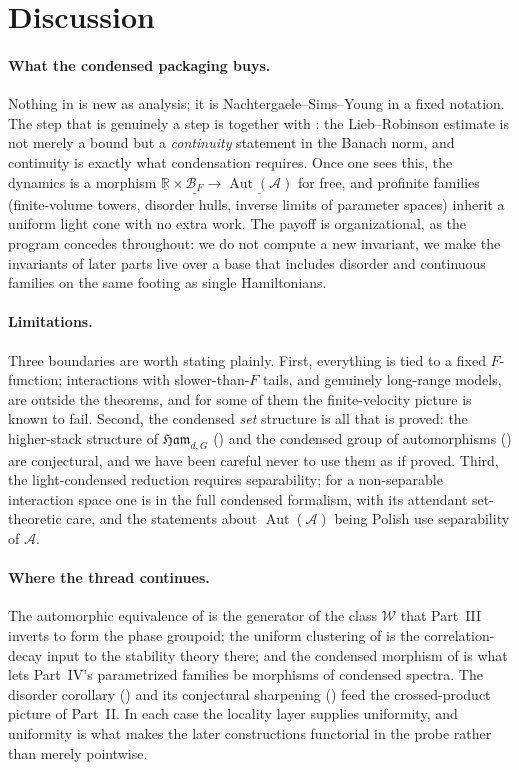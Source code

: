 \documentclass[12pt]{article}
\newcommand{\cond}[1]{\underline{#1}}          %
\newcommand{\Ffun}{F}                          %
\newcommand{\BF}{\mathcal{B}_{F}}              %
\newcommand{\Ham}{\mathfrak{Ham}}              %
\newcommand{\Weq}{\mathcal{W}}                 %
\newcommand{\qA}{\mathcal{A}}
\newcommand{\Aut}{\operatorname{Aut}}
\newcommand{\R}{\mathbb{R}}
\theoremstyle{definition}
\theoremstyle{remark}
\begin{document}
\section{Discussion}
\label{sec:discussion}

\paragraph{What the condensed packaging buys.}
Nothing in  is new as analysis; it is Nachtergaele--Sims--Young in a fixed
notation. The step that is genuinely a step is  together with
: the Lieb--Robinson estimate is not merely a bound but a
\emph{continuity} statement in the Banach norm, and continuity is exactly what condensation
requires. Once one sees this, the dynamics is a morphism $\cond{\R}\times
\cond{\BF}\to\cond{\Aut(\qA)}$ for free, and profinite families (finite-volume towers,
disorder hulls, inverse limits of parameter spaces) inherit a uniform light cone with no extra
work. The payoff is organizational, as the program concedes throughout: we do not compute a new
invariant, we make the invariants of later parts live over a base that includes disorder and
continuous families on the same footing as single Hamiltonians.

\paragraph{Limitations.}
Three boundaries are worth stating plainly. First, everything is tied to a fixed
$\Ffun$-function; interactions with slower-than-$\Ffun$ tails, and genuinely long-range models,
are outside the theorems, and for some of them the finite-velocity picture is known to
fail. Second, the condensed \emph{set} structure is all that is proved: the higher-stack
structure of $\Ham_{d,G}$ () and the condensed group of automorphisms
() are conjectural, and we have been careful never to use them as if proved.
Third, the light-condensed reduction requires separability; for a non-separable interaction
space one is in the full condensed formalism, with its attendant set-theoretic care, and the
statements about $\Aut(\qA)$ being Polish use separability of $\qA$.

\paragraph{Where the thread continues.}
The automorphic equivalence of  is the generator of the class $\Weq$ that
Part~III inverts to form the phase groupoid; the uniform clustering of 
is the correlation-decay input to the stability theory there; and the condensed morphism of
 is what lets Part~IV's parametrized families be morphisms of
condensed spectra. The disorder corollary () and its conjectural
sharpening () feed the crossed-product picture of Part~II. In each case the
locality layer supplies uniformity, and uniformity is what makes the later constructions
functorial in the probe rather than merely pointwise.
\end{document}
